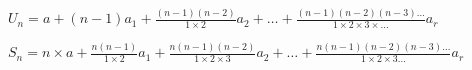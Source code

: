 \par\noindent$U_n = a + (n - 1) a_1 + \frac{(n - 1) (n - 2)}{1 \times 2} a_2 + \ldots + \frac{(n - 1) (n - 2) (n - 3) \ldots}{1 \times 2 \times 3 \times \ldots} a_r$
\newline
\par\noindent$S_n = n \times a + \frac{n(n - 1)}{1 \times 2} a_1 + \frac{n (n - 1) (n - 2)}{1 \times 2 \times 3} a_2 + \ldots + \frac{n(n-1)(n-2)(n-3)\ldots}{1\times2\times3\ldots} a_r$
